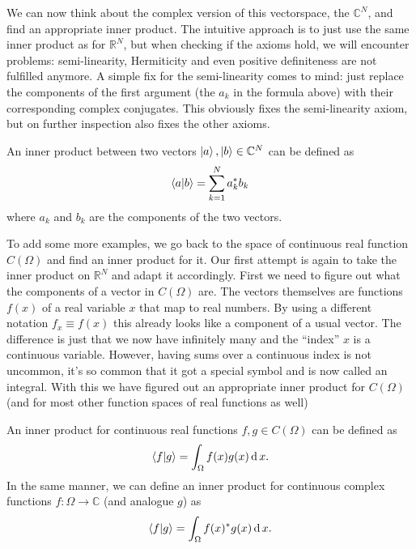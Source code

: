 We can now think about the complex version of this vectorspace, the $\mathbb{C}^N$, and find an appropriate inner product.
The intuitive approach is to just use the same inner product as for $\mathbb{R}^N$, but when checking if the axioms hold, we will encounter problems: semi-linearity, Hermiticity and even positive definiteness are not fulfilled anymore. 
A simple fix for the semi-linearity comes to mind: just replace the components of the first argument (the $a_k$ in the formula above) with their corresponding complex conjugates. This obviously fixes the semi-linearity axiom, but on further inspection also fixes the other axioms. 
\begin{ex*} An inner product between two  vectors $\ket{a},\ket{b} \in \mathbb{C}^N$ can be defined as
\begin{align*}
    \braket{a}{b} = \sum_{k=1}^N a_k^\ast b_k
\end{align*}
where $a_k$ and $b_k$ are the components of the two vectors.
\end{ex*}
To add some more examples, we go back to the space of continuous real function $C(\Omega)$ and find an inner product for it. 
Our first attempt is again to take the inner product on $\mathbb{R}^N$ and adapt it accordingly. 
First we need to figure out what the components of a vector in $C(\Omega)$ are. 
The vectors themselves are functions $f(x)$ of a real variable $x$ that map to real numbers. 
By using a different notation $f_x\equiv f(x)$ this already looks like a component of a usual vector. 
The difference is just that we now have infinitely many and the ``index'' $x$ is a continuous variable.
However, having sums over a continuous index is not uncommon, it's so common that it got a special symbol and is now called an integral. With this we have figured out an appropriate inner product for $C(\Omega)$ (and for most other function spaces of real functions as well)
\begin{ex*} An inner product for continuous real functions $f,g\in C(\Omega)$ can be defined as
\begin{align*}
    \braket{f}{g} = \int_\Omega f(x)g(x) \operatorname{d}x.
\end{align*}
In the same manner, we can define an inner product for continuous complex functions $f:\Omega \rightarrow \mathbb{C}$ (and analogue $g$) as
\begin{align*}
    \braket{f}{g} = \int_\Omega f(x)^*g(x) \operatorname{d}x.
\end{align*}
\end{ex*}
